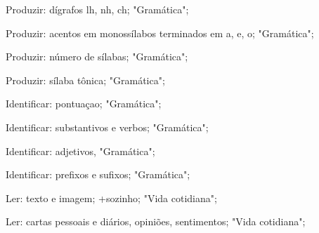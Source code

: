  Produzir: dígrafos lh, nh, ch; "Gramática";

 Produzir: acentos em monossílabos terminados em a, e, o;  "Gramática";

 Produzir: número de sílabas; "Gramática";

 Produzir: sílaba tônica; "Gramática";

 Identificar: pontuaçao; "Gramática";

 Identificar: substantivos e verbos; "Gramática";

 Identificar: adjetivos, "Gramática";

 Identificar: prefixos e sufixos; "Gramática";

 Ler: texto e imagem; +sozinho; "Vida cotidiana"; 

 Ler:  cartas pessoais e diários, opiniões, sentimentos; "Vida cotidiana";

